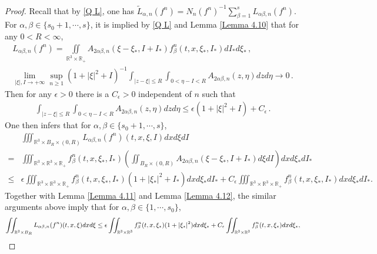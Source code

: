 \documentclass[reqno,11pt]{amsart}
\numberwithin{equation}{section}
\def\R{\mathbb{R}}
\begin{document}
\begin{proof}
	
Recall that by \eqref{Q L}, one has $\tilde{L}_{\alpha, n} (f^n) = N_n (f^n)^{-1} \sum_{\beta = 1}^{s} L_{\alpha \beta, n} (f^n)$. For $\alpha, \beta \in \{ s_0 + 1, \cdots, s \}$, it is implied by \eqref{Q L} and Lemma \ref{Lemma 4.10} that for any $0 < R < \infty$,
\begin{equation*}
  \begin{aligned}
    L_{\alpha \beta, n} (f^n) = \iint\limits_{ \R^3 \times \R_+ } A_{2 \alpha \beta ,n} (\xi - \xi_*, I + I_* ) f^n_\beta (t,x ,\xi_*,I_* ) d I_* d \xi_* \,, \\
    \lim_{ |\xi|, I \to + \infty } \sup \limits_{n \geq 1} (1+|\xi|^2 +  I )^{-1} \int_{|z-\xi |\leq R } \int_{0<\eta -I < R } A_{2\alpha \beta ,n } (z,\eta ) dzd\eta \rightarrow 0 \,.
  \end{aligned}
\end{equation*}
Then for any $\epsilon > 0$ there is a $C_\epsilon > 0$ independent of $n$ such that
\begin{equation}\label{A-bnd}
  \begin{aligned}
    \int_{|z-\xi |\leq R } \int_{0<\eta -I < R } A_{2\alpha \beta ,n } (z,\eta ) dzd\eta \leq \epsilon (1+|\xi|^2 +  I ) + C_\epsilon \,.
  \end{aligned}
\end{equation}
One then infers that for $\alpha, \beta \in \{ s_0 + 1, \cdots , s \}$,
\begin{equation}\label{Trans-fab}
	\begin{aligned}	
		& \iiint_{\R^3 \times B_R \times (0,R)} L_{ \alpha \beta ,n} (f^n) (t,x,\xi, I) dxd\xi dI \\
= & \iiint_{\R^3 \times \R^3 \times \R_+}f^n_{\beta} (t,x,\xi_*, I_*) ( \iint_{B_R \times (0,R)}  A_{2\alpha \beta ,n}(\xi-\xi_*,I+I_*) d\xi dI ) dxd\xi_* dI_* \\
			\leq & \epsilon \iiint_{\R^3 \times \R^3 \times \R_+} f^n_{\beta} (t,x ,\xi_*, I_*) (1+|\xi_*|^2 +I_*) dxd\xi_* dI_* + C_\epsilon \iiint_{\R^3 \times \R^3 \times \R_+} f^n_{\beta} (t,x, \xi_*, I_*) dxd\xi_* dI_*.
		\end{aligned}
	\end{equation}
Together with Lemma \ref{Lemma 4.11} and Lemma \ref{Lemma 4.12}, the similar arguments above imply that for $\alpha,\beta \in \{1,\cdots,s_0\}$,
	\begin{equation*}{\small
		\begin{aligned}	
			\iint_{\R^3 \times B_R } L_{ \alpha \beta ,n} (f^n) (t,x,\xi) dxd\xi \leq \epsilon \iint_{\R^3 \times \R^3 } f^n_{\beta} (t, x, \xi_*) (1+|\xi_*|^2) dxd\xi_* +C_\epsilon \iint_{\R^3 \times \R^3 } f^n_{\beta} (t, x, \xi_*) dxd\xi_*,

\end{aligned}}
\end{equation*}
\end{proof}
\end{document}
